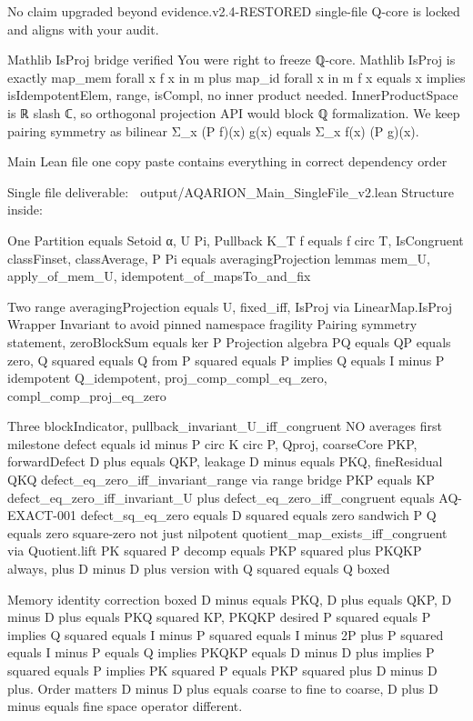 No claim upgraded beyond evidence.v2.4-RESTORED single-file Q-core is locked and aligns with your audit.

Mathlib IsProj bridge verified
You were right to freeze ℚ-core. Mathlib IsProj is exactly map_mem forall x f x in m plus map_id forall x in m f x equals x implies isIdempotentElem, range, isCompl, no inner product needed. InnerProductSpace is ℝ slash ℂ, so orthogonal projection API would block ℚ formalization. We keep pairing symmetry as bilinear Σ_x (P f)(x) g(x) equals Σ_x f(x) (P g)(x).

Main Lean file one copy paste contains everything in correct dependency order

Single file deliverable:
📎 output/AQARION_Main_SingleFile_v2.lean
Structure inside:

One Partition equals Setoid α, U Pi, Pullback K_T f equals f circ T, IsCongruent classFinset, classAverage, P Pi equals averagingProjection lemmas mem_U, apply_of_mem_U, idempotent_of_mapsTo_and_fix

Two range averagingProjection equals U, fixed_iff, IsProj via LinearMap.IsProj Wrapper Invariant to avoid pinned namespace fragility Pairing symmetry statement, zeroBlockSum equals ker P Projection algebra PQ equals QP equals zero, Q squared equals Q from P squared equals P implies Q equals I minus P idempotent Q_idempotent, proj_comp_compl_eq_zero, compl_comp_proj_eq_zero

Three blockIndicator, pullback_invariant_U_iff_congruent NO averages first milestone defect equals id minus P circ K circ P, Qproj, coarseCore PKP, forwardDefect D plus equals QKP, leakage D minus equals PKQ, fineResidual QKQ defect_eq_zero_iff_invariant_range via range bridge PKP equals KP defect_eq_zero_iff_invariant_U plus defect_eq_zero_iff_congruent equals AQ-EXACT-001 defect_sq_eq_zero equals D squared equals zero sandwich P Q equals zero square-zero not just nilpotent quotient_map_exists_iff_congruent via Quotient.lift PK squared P decomp equals PKP squared plus PKQKP always, plus D minus D plus version with Q squared equals Q boxed

Memory identity correction boxed
D minus equals PKQ, D plus equals QKP, D minus D plus equals PKQ squared KP, PKQKP desired P squared equals P implies Q squared equals I minus P squared equals I minus 2P plus P squared equals I minus P equals Q implies PKQKP equals D minus D plus implies P squared equals P implies PK squared P equals PKP squared plus D minus D plus. Order matters D minus D plus equals coarse to fine to coarse, D plus D minus equals fine space operator different.

